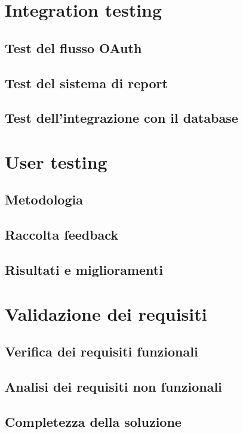\documentclass[12pt,a4paper,oneside]{report}
\begin{document}
\section{Integration testing}
\subsection{Test del flusso OAuth}

\subsection{Test del sistema di report}

\subsection{Test dell'integrazione con il database}

\section{User testing}
\subsection{Metodologia}

\subsection{Raccolta feedback}

\subsection{Risultati e miglioramenti}

\section{Validazione dei requisiti}
\subsection{Verifica dei requisiti funzionali}

\subsection{Analisi dei requisiti non funzionali}

\subsection{Completezza della soluzione}
\end{document}
